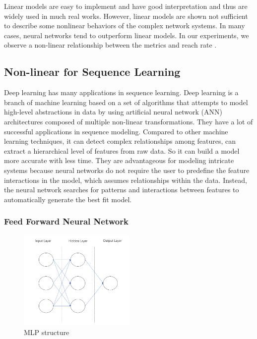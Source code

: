 \documentclass[5p]{elsarticle}
\newcommand{\dabiaolv}{reach rate }
\begin{document}
Linear models are easy to implement and have good interpretation and thus are widely used in much real works. However, linear models are shown not sufficient to describe some nonlinear behaviors of the complex network systems. In many cases, neural networks tend to outperform linear models. In our experiments, we observe a non-linear relationship between the metrics and \dabiaolv.

\subsection{Non-linear for Sequence Learning}

Deep learning has many applications in sequence learning. Deep learning is a branch of machine learning based on a set of algorithms that attempts to model high-level abstractions in data by using artificial neural network (ANN) architectures composed of multiple non-linear transformations. They have a lot of successful applications in sequence modeling. Compared to other machine learning techniques, it can detect complex relationships among features, can extract a hierarchical level of features from raw data. So it can build a model more accurate with less time. They are advantageous for modeling intricate systems because neural networks do not require the user to predefine the feature interactions in the model, which assumes relationships within the data. Instead, the neural network searches for patterns and interactions between features to automatically generate the best fit model.


\subsubsection{Feed Forward Neural Network}
\begin{figure}[h]
    \centering
    \includegraphics[width=0.5\textwidth]{mlp.png}
    \caption{MLP structure}
    \label{fig:RNN}
\end{figure}
\end{document}
